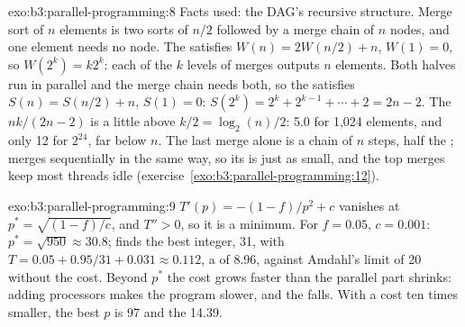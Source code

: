 \begin{solution}{exo:b3:parallel-programming:8}
Facts used: the DAG's recursive structure. Merge sort of $n$ elements is two sorts of $n/2$ followed by a merge chain of $n$ nodes, and one element needs no node. The  satisfies $W(n) = 2W(n/2) + n$, $W(1) = 0$, so $W(2^k) = k 2^k$: each of the $k$ levels of merges outputs $n$ elements. Both halves run in parallel and the merge chain needs both, so the  satisfies $S(n) = S(n/2) + n$, $S(1) = 0$: $S(2^k) = 2^k + 2^{k-1} + \cdots + 2 = 2n - 2$. The  $nk/(2n - 2)$ is a little above $k/2 = \log_2(n)/2$: 5.0 for 1,024 elements, and only 12 for $2^{24}$, far below $n$. The last merge alone is a chain of $n$ steps, half the ;  merges sequentially in the same way, so its  is just as small, and the top merges keep most threads idle (exercise~\ref{exo:b3:parallel-programming:12}).
\end{solution}

\begin{solution}{exo:b3:parallel-programming:9}
$T'(p) = -(1 - f)/p^2 + c$ vanishes at $p^* = \sqrt{(1 - f)/c}$, and $T'' > 0$, so it is a minimum. For $f = 0.05$, $c = 0.001$: $p^* = \sqrt{950} \approx 30.8$;  finds the best integer, 31, with $T = 0.05 + 0.95/31 + 0.031 \approx 0.112$, a  of 8.96, against Amdahl's limit of 20 without the cost. Beyond $p^*$ the cost grows faster than the parallel part shrinks: adding processors makes the program slower, and the  falls. With a cost ten times smaller, the best $p$ is 97 and the  14.39.
\end{solution}


